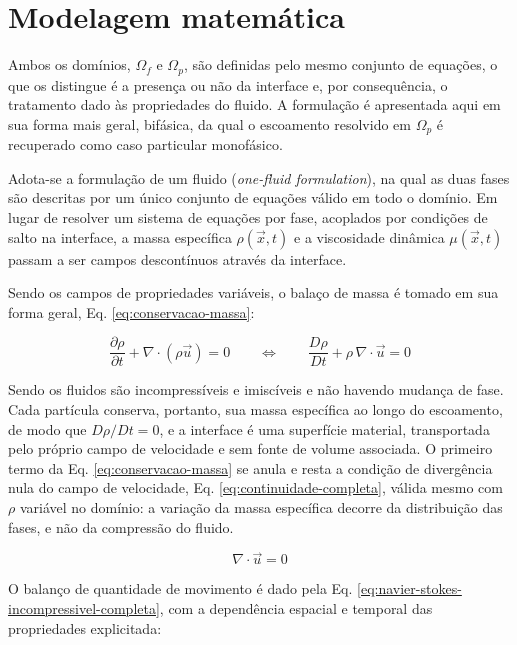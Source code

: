 \section{Modelagem matemática}
\label{sec:modelagem-matematica}

Ambos os domínios, $\Omega_f$ e $\Omega_p$, são definidas pelo mesmo conjunto de equações, o que os distingue é a presença ou não da interface e, por consequência, o tratamento dado às propriedades do fluido. A formulação é apresentada aqui em sua forma mais geral, bifásica, da qual o escoamento resolvido em $\Omega_p$ é recuperado como caso particular monofásico.

Adota-se a formulação de um fluido (\textit{one-fluid formulation}), na qual as duas fases são descritas por um único conjunto de equações válido em todo o domínio. Em lugar de resolver um sistema de equações por fase, acoplados por condições de salto na interface, a massa específica $\rho(\vec{x},t)$ e a viscosidade dinâmica $\mu(\vec{x},t)$ passam a ser campos descontínuos através da interface.

Sendo os campos de propriedades variáveis, o balaço de massa é tomado em sua forma geral, Eq. \ref{eq:conservacao-massa}:

\begin{equation}
    \frac{\partial \rho}{\partial t} + \nabla \cdot \left( \rho \vec{u} \right) = 0
    \qquad \Longleftrightarrow \qquad
    \frac{D \rho}{D t} + \rho \, \nabla \cdot \vec{u} = 0
    \label{eq:conservacao-massa}
\end{equation}

Sendo os fluidos são incompressíveis e imiscíveis e não havendo mudança de fase. Cada partícula conserva, portanto, sua massa específica ao longo do escoamento, de modo que $D\rho / Dt = 0$, e a interface é uma superfície material, transportada pelo próprio campo de velocidade e sem fonte de volume associada. O primeiro termo da Eq. \ref{eq:conservacao-massa} se anula e resta a condição de divergência nula do campo de velocidade, Eq. \ref{eq:continuidade-completa}, válida mesmo com $\rho$ variável no domínio: a variação da massa específica decorre da distribuição das fases, e não da compressão do fluido. 

\begin{equation}
    \nabla \cdot \vec{u} = 0
    \label{eq:continuidade-completa}
\end{equation}

O balanço de quantidade de movimento é dado pela Eq. \ref{eq:navier-stokes-incompressivel-completa}, com a dependência espacial e temporal das propriedades explicitada:

